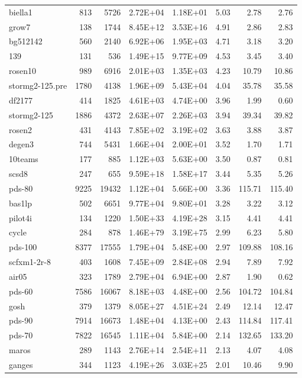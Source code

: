 \documentclass[10pt]{article}
\begin{document}
\begin{longtable}{|l|r|r|r|r|r|r|r|}
biella1	&	813	&	5726	&	2.72E+04	&	1.18E+01	&	5.03	&	2.78	&	2.76	\\
grow7	&	138	&	1744	&	8.45E+12	&	3.53E+16	&	4.91	&	2.86	&	2.83	\\
bg512142	&	560	&	2140	&	6.92E+06	&	1.95E+03	&	4.71	&	3.18	&	3.20	\\
139	&	131	&	536	&	1.49E+15	&	9.77E+09	&	4.53	&	3.45	&	3.40	\\
rosen10	&	989	&	6916	&	2.01E+03	&	1.35E+03	&	4.23	&	10.79	&	10.86	\\
stormg2-125.pre	&	1780	&	4138	&	1.96E+09	&	5.43E+04	&	4.04	&	35.78	&	35.58	\\
df2177	&	414	&	1825	&	4.61E+03	&	4.74E+00	&	3.96	&	1.99	&	0.60	\\
stormg2-125	&	1886	&	4372	&	2.63E+07	&	2.26E+03	&	3.94	&	39.34	&	39.82	\\
rosen2	&	431	&	4143	&	7.85E+02	&	3.19E+02	&	3.63	&	3.88	&	3.87	\\
degen3	&	744	&	5431	&	1.66E+04	&	2.00E+01	&	3.52	&	1.70	&	1.71	\\
10teams	&	177	&	885	&	1.12E+03	&	5.63E+00	&	3.50	&	0.87	&	0.81	\\
scsd8	&	247	&	655	&	9.59E+18	&	1.58E+17	&	3.44	&	5.35	&	5.26	\\
pds-80	&	9225	&	19432	&	1.12E+04	&	5.66E+00	&	3.36	&	115.71	&	115.40	\\
bas1lp	&	502	&	6651	&	9.77E+04	&	9.80E+01	&	3.28	&	3.22	&	3.12	\\
pilot4i	&	134	&	1220	&	1.50E+33	&	4.19E+28	&	3.15	&	4.41	&	4.41	\\
cycle	&	284	&	878	&	1.46E+79	&	3.19E+75	&	2.99	&	6.23	&	5.80	\\
pds-100	&	8377	&	17555	&	1.79E+04	&	5.48E+00	&	2.97	&	109.88	&	108.16	\\
scfxm1-2r-8	&	403	&	1608	&	7.45E+09	&	2.84E+08	&	2.94	&	7.89	&	7.92	\\
air05	&	323	&	1789	&	2.79E+04	&	6.94E+00	&	2.87	&	1.90	&	0.62	\\
pds-60	&	7586	&	16067	&	8.18E+03	&	4.48E+00	&	2.56	&	104.72	&	104.84	\\
gosh	&	379	&	1379	&	8.05E+27	&	4.51E+24	&	2.49	&	12.14	&	12.47	\\
pds-90	&	7914	&	16673	&	1.48E+04	&	4.13E+00	&	2.43	&	114.84	&	117.41	\\
pds-70	&	7822	&	16545	&	1.11E+04	&	5.84E+00	&	2.14	&	132.65	&	133.20	\\
maros	&	289	&	1143	&	2.76E+14	&	2.54E+11	&	2.13	&	4.07	&	4.08	\\
ganges	&	344	&	1123	&	4.19E+26	&	3.03E+25	&	2.01	&	10.46	&	9.90	\\

\end{longtable}
\end{document}
